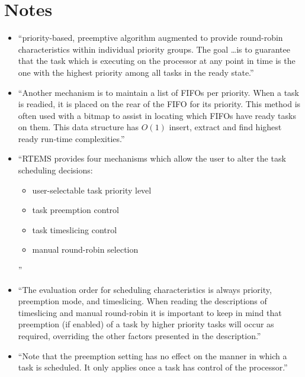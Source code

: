 \section{Notes}

\begin{itemize}
    \item 
      ``priority-based, preemptive algorithm augmented to provide round-robin
        characteristics within individual priority groups. The goal \dots is to
        guarantee that the task which is executing on the processor at any point
        in time is the one with the highest priority among all tasks in the
        ready state.''
        \cite[\S5.2.2]{RTEMS:CUSER}
    \item 
      ``Another mechanism is to maintain a list of FIFOs per priority. 
        When a task is readied, 
        it is placed on the rear of the FIFO for its priority.
        This method is often used with a bitmap to assist in
        locating which FIFOs have ready tasks on them. 
        This data structure has $O(1)$ insert, extract and 
        find highest ready run-time complexities.''
        \cite[\S5.2.2]{RTEMS:CUSER}
    \item 
      ``RTEMS provides four mechanisms which allow the user to alter 
        the task scheduling decisions:
        \begin{itemize}
            \item user-selectable task priority level
            \item task preemption control
            \item task timeslicing control
            \item manual round-robin selection
    \end{itemize}''
      \cite[\S5.2.3]{RTEMS:CUSER}
    \item 
      ``The evaluation order for scheduling characteristics is always priority,
        preemption mode, and timeslicing. 
        When reading the descriptions of timeslicing and manual round-robin
        it is important to keep in mind that preemption (if enabled)
        of a task by higher priority tasks will occur as required, 
        overriding the other factors presented in the description.''
        \cite[\S5.2.3]{RTEMS:CUSER}
    \item 
      ``Note that the preemption setting has no effect on the manner
        in which a task is scheduled. 
        It only applies once a task has control of the processor.''
        \cite[\S5.2.3.2]{RTEMS:CUSER}

\end{itemize}
